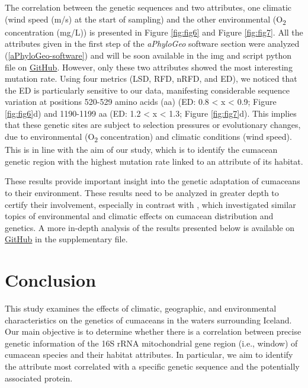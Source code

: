 The correlation between the genetic sequences and two attributes, one climatic (wind speed (m/s) at the start of sampling) and the other environmental (O\textsubscript{2} concentration (mg/L)) is presented in Figure \ref{fig:fig6} and Figure \ref{fig:fig7}. All the attributes given in the first step of the \textit{aPhyloGeo} software section were analyzed (\autoref{aPhyloGeo-software}) and will be soon available in the img and script python file on \href{https://github.com/tahiri-lab/Cumacea_aPhyloGeo}{GitHub}. However, only these two attributes showed the most interesting mutation rate. Using four metrics (LSD, RFD, nRFD, and ED), we noticed that the ED is particularly sensitive to our data, manifesting considerable sequence variation at positions 520-529 amino acids (aa) (ED: 0.8 < x < 0.9; Figure \ref{fig:fig6}d) and 1190-1199 aa (ED: 1.2 < x < 1.3; Figure \ref{fig:fig7}d). This implies that these genetic sites are subject to selection pressures or evolutionary changes, due to environmental (O\textsubscript{2} concentration) and climatic conditions (wind speed). This is in line with the aim of our study, which is to identify the cumacean genetic region with the highest mutation rate linked to an attribute of its habitat.

These results provide important insight into the genetic adaptation of cumaceans to their environment. These results need to be analyzed in greater depth to certify their involvement, especially in contrast with \citep{uhlir_adding_2021}, which investigated similar topics of environmental and climatic effects on cumacean distribution and genetics. A more in-depth analysis of the results presented below is available on \href{https://github.com/tahiri-lab/Cumacea_aPhyloGeo}{GitHub} in the supplementary file.

\section{Conclusion}\label{conclusion}
This study examines the effects of climatic, geographic, and environmental characteristics on the genetics of cumaceans in the waters surrounding Iceland. Our main objective is to determine whether there is a  correlation between precise genetic information of the 16S rRNA mitochondrial gene region (i.e., window) of cumacean species and their habitat attributes. In particular, we aim to identify the attribute most correlated with a specific genetic sequence and the potentially associated protein.

